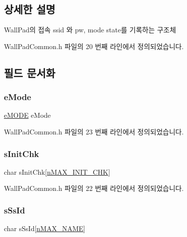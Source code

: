 \subsection{상세한 설명}
Wall\+Pad의 접속 ssid 와 pw, mode state를 기록하는 구조체 

Wall\+Pad\+Common.\+h 파일의 20 번째 라인에서 정의되었습니다.



\subsection{필드 문서화}
\mbox{\label{struct_st_wall_pad_a51f947b3c4ad6a33d096bfaf1caedb6e}} 
\subsubsection{\texorpdfstring{e\+Mode}{eMode}}
{\footnotesize\ttfamily \mbox{\hyperlink{_wall_pad_common_8h_a066235770a533eb740dc3fd2494d64da}{e\+M\+O\+DE}} e\+Mode}



Wall\+Pad\+Common.\+h 파일의 23 번째 라인에서 정의되었습니다.

\mbox{\label{struct_st_wall_pad_afa1dc1e2339538ae37ff115251ce1187}} 
\subsubsection{\texorpdfstring{s\+Init\+Chk}{sInitChk}}
{\footnotesize\ttfamily char s\+Init\+Chk\mbox{[}\mbox{\hyperlink{_wall_pad_common_8h_a633363122e0b4c2005649a1664a2335a}{n\+M\+A\+X\+\_\+\+I\+N\+I\+T\+\_\+\+C\+HK}}\mbox{]}}



Wall\+Pad\+Common.\+h 파일의 22 번째 라인에서 정의되었습니다.

\mbox{\label{struct_st_wall_pad_afb1618185a1aecb8c77eff2f1453c24f}} 
\subsubsection{\texorpdfstring{s\+Ss\+Id}{sSsId}}
{\footnotesize\ttfamily char s\+Ss\+Id\mbox{[}\mbox{\hyperlink{_wall_pad_common_8h_aa1bfef2ce53d431c709ee094aa02ccb6}{n\+M\+A\+X\+\_\+\+N\+A\+ME}}\mbox{]}}



